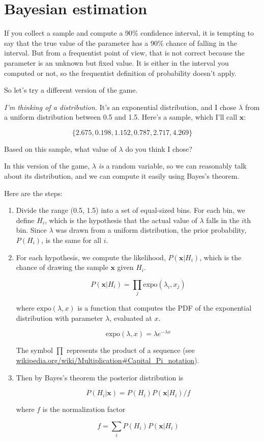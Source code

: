 \documentclass[12pt]{book}
\begin{document}
\section{Bayesian estimation}

If you collect a sample and compute a 90\% confidence interval, it is
tempting to say that the true value of the parameter has a 90\% chance
of falling in the interval.  But from a frequentist point of view,
that is not correct because the parameter is an unknown but fixed
value.  It is either in the interval you computed or not, so the
frequentist definition of probability doesn't apply.

So let's try a different version of the game.

\newcommand{\boldx}{\mathbf{x}}

{\em I'm thinking of a distribution.}  It's an exponential
distribution, and I chose $\lambda$ from a uniform distribution
between 0.5 and 1.5.  Here's a sample, which I'll call $\boldx$:

\[ \{ 2.675, 0.198, 1.152, 0.787, 2.717, 4.269 \} \]

Based on this sample, what value of $\lambda$ do you think I chose?

In this version of the game, $\lambda$ {\em is} a random variable, so we
can reasonably talk about its distribution, and we can compute it
easily using Bayes's theorem.

Here are the steps:

\begin{enumerate}

\item Divide the range (0.5, 1.5) into a set of equal-sized bins.
For each bin, we define $H_i$, which is the hypothesis that the
actual value of $\lambda$ falls in the $i$th bin.
Since $\lambda$ was drawn from a uniform distribution, the prior
probability, $P(H_i)$, is the same for all $i$.

\item For each hypothesis, we compute the likelihood, $P(\boldx|H_i)$,
which is the chance of drawing the sample $\boldx$ given $H_i$.

\[ P(\boldx|H_i) = \prod_j \mathrm{expo}(\lambda_i, x_j)  \]

where $\mathrm{expo}(\lambda, x)$ is a function that
computes the PDF of the exponential distribution with parameter $\lambda$,
evaluated at $x$.  

\[ \mathrm{expo}(\lambda, x) = \lambda e^{-\lambda x}\]

The symbol $\prod$ represents the product of a sequence (see
\url{wikipedia.org/wiki/Multiplication#Capital_Pi_notation}).

\item Then by Bayes's theorem the posterior distribution is

\[ P(H_i|\boldx) =  P(H_i) P(\boldx|H_i) / f \]

where $f$ is the normalization factor

\[ f = \sum_i P(H_i) P(\boldx|H_i) \]

\end{enumerate}
\end{document}
